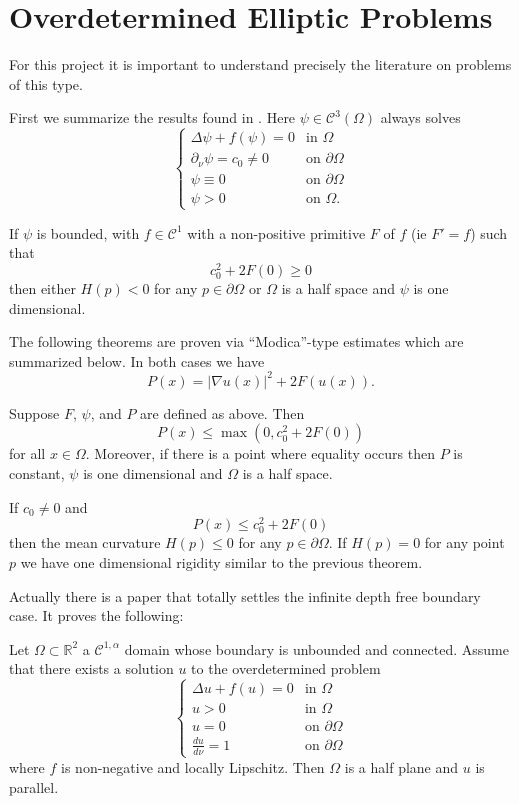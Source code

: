 \section{Overdetermined Elliptic Problems}

For this project it is important to understand precisely the literature on problems of this type.

First we summarize the results found in \cite{RSW23}. Here $\psi \in \mathcal{C}^3(\Omega)$ always solves
\[\begin{cases} \Delta \psi + f(\psi) = 0 & \text{in $\Omega$} \\ 
\partial_\nu\psi = c_0 \neq 0 & \text{on $\partial \Omega$} \\ 
\psi \equiv 0 & \text{on $\partial \Omega$} \\
\psi > 0 & \text{on $\Omega$.}
\end{cases}\]
\begin{theorem}
    If $\psi$ is bounded, with $f \in \mathcal{C}^1$ with a non-positive primitive $F$ of $f$ (ie $F' = f$) such that 
    \[c_0^2 + 2F(0) \geq 0\]
    then either $H(p) < 0$ for any $p \in \partial \Omega$ or $\Omega$ is a half space and $\psi$ is one dimensional.
\end{theorem}

The following theorems are proven via ``Modica''-type estimates which are summarized below. In both cases we have 
\[P(x) = |\nabla u(x)|^2 + 2F(u(x)).\]

\begin{theorem}
    Suppose $F$, $\psi$, and $P$ are defined as above. Then
    \[P(x) \leq \max(0, c_0^2 + 2F(0))\]
    for all $x \in \Omega$. Moreover, if there is a point where equality occurs then $P$ is constant, $\psi$ is one dimensional and $\Omega$ is a half space.
\end{theorem}

\begin{theorem}
    If $c_0 \neq 0$ and 
    \[P(x) \leq c_0^2 + 2F(0)\]
    then the mean curvature $H(p) \leq 0$ for any $p \in \partial \Omega$. If $H(p) = 0$ for any point $p$ we have one dimensional rigidity similar to the previous theorem.
\end{theorem}

Actually there is a paper \cite{RRS17} that totally settles the infinite depth free boundary case. It proves the following:
\begin{theorem}
    Let $\Omega \subset \mathbb{R}^2$ a $\mathcal{C}^{1,\alpha}$ domain whose boundary is unbounded and connected. Assume that there exists a solution $u$ to the overdetermined problem
    \[\begin{cases}
        \Delta u + f(u) = 0 & \text{in $\Omega$} \\
        u > 0 & \text{in $\Omega$} \\
        u = 0 & \text{on $\partial \Omega$} \\
        \frac{du}{d\nu} = 1 & \text{on $\partial \Omega$}
    \end{cases}\]
    where $f$ is non-negative and locally Lipschitz. Then $\Omega$ is a half plane and $u$ is parallel.
    
\end{theorem}




